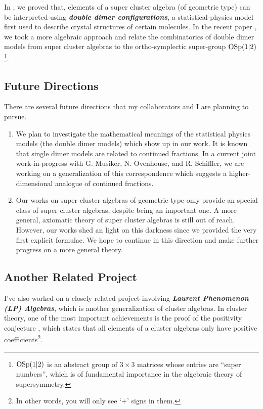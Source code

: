 \documentclass[11pt]{amsart}
\newcommand{\Emph}[1]{\textbf{\emph{#1}}}
\begin{document}
In \cite{moz1,moz2}, we proved that, elements of a super cluster algebra (of geometric type) %
can be interpreted using \Emph{double dimer configurations}, a statistical-physics model first used to describe crystal structures of certain molecules. In the recent paper \cite{moz3}, we took a more algebraic approach and relate the combinatorics of double dimer models from super cluster algebras to the ortho-symplectic super-group $\textup{OSp}(1|2)$\footnote{$\textup{OSp}(1|2)$ is an abstract group of $3\times 3$ matrices whose entries are ``super numbers'', which is of fundamental importance in the algebraic theory of supersymmetry.}.
\subsection*{Future Directions}There are several future directions that my collaborators and I are planning to pursue.
\begin{enumerate}
	\item We plan to investigate the mathematical meanings of the statistical physics models (the double dimer models) which show up in our work. It is known that single dimer models are related to continued fractions. In a current joint work-in-progress with G. Musiker, N. Ovenhouse, and R. Schiffler, we are working on a generalization of this correspondence which suggests a higher-dimensional analogue of continued fractions.
	\item Our works on super cluster algebras of geometric type only provide an special class of super cluster algebras, despite being an important one. A more general, axiomatic theory of super cluster algebras is still out of reach. However, our works shed an light on this darkness since we provided the very first explicit formulae. We hope to continue in this direction and make further progress on a more general theory.
\end{enumerate}
\subsection*{Another Related Project}
I've also worked on a closely related project involving \Emph{Laurent Phenomenon (LP) Algebras}, which is another generalization of cluster algebras.
In cluster theory, one of the most important achievements is the proof of the positivity conjecture \cite{lee2015positivity}, which states that all elements of a cluster algebras only have positive coefficients\footnote{In other words, you will only see `+' signs in them.}. 
\end{document}
